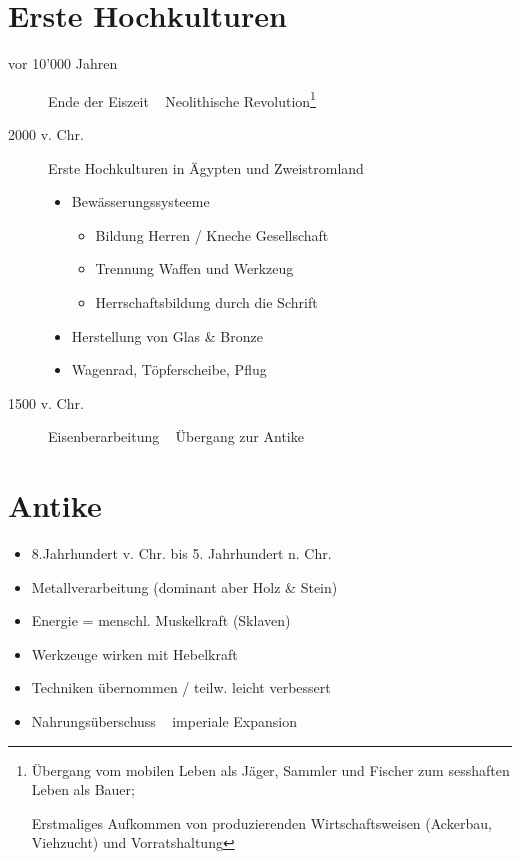 \documentclass{report}
\begin{document}
\section{Erste Hochkulturen}
\begin{description}
	\item[vor 10'000 Jahren] Ende der Eiszeit \arrow~ Neolithische Revolution\footnote{Übergang vom mobilen Leben als Jäger, Sammler und Fischer zum sesshaften Leben als Bauer;\par Erstmaliges Aufkommen von produzierenden Wirtschaftsweisen (Ackerbau, Viehzucht) und Vorratshaltung}
	\item[2000 v. Chr.] Erste Hochkulturen in Ägypten und Zweistromland
		\begin{itemize}
			\item Bewässerungssysteeme
				\begin{itemize}
					\item Bildung Herren / Kneche Gesellschaft
					\item Trennung Waffen und Werkzeug
					\item Herrschaftsbildung durch die Schrift
				\end{itemize}
			\item Herstellung von Glas \& Bronze
			\item Wagenrad, Töpferscheibe, Pflug
		\end{itemize}
	\item[1500 v. Chr.] Eisenberarbeitung \arrow~ Übergang zur Antike
\end{description}

\newpage

\section{Antike}
\begin{itemize}
	\item 8.Jahrhundert v. Chr. bis 5. Jahrhundert n. Chr.
	\item Metallverarbeitung (dominant aber Holz \& Stein)
	\item Energie = menschl. Muskelkraft (Sklaven)
	\item Werkzeuge wirken mit Hebelkraft
	\item Techniken übernommen / teilw. leicht verbessert
	\item Nahrungsüberschuss \arrow~ imperiale Expansion
\end{itemize}
\end{document}
